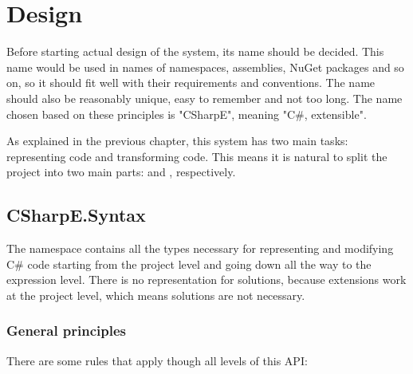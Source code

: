 \chapter{Design}

Before starting actual design of the system, its name should be decided. This name would be used in names of namespaces, assemblies, NuGet packages and so on, so it should fit well with their requirements and conventions. The name should also be reasonably unique, easy to remember and not too long. The name chosen based on these principles is "CSharpE", meaning "C\#, extensible".

As explained in the previous chapter, this system has two main tasks: representing code and transforming code. This means it is natural to split the project into two main parts:  and , respectively.

\section{CSharpE.Syntax}

The  namespace contains all the types necessary for representing and modifying C\# code starting from the project level and going down all the way to the expression level. There is no representation for solutions, because extensions work at the project level, which means solutions are not necessary.


\subsection{General principles}

There are some rules that apply though all levels of this \ac{API}:

